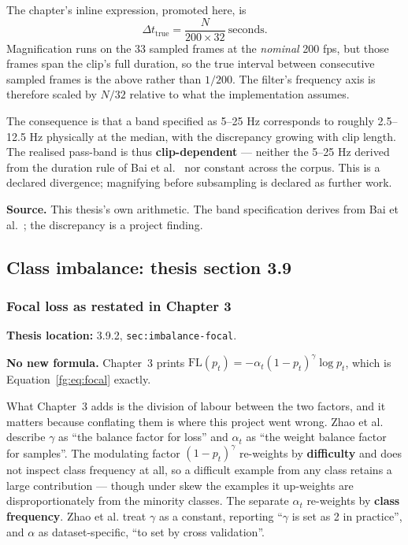 \documentclass[11pt,a4paper]{article}
\numberwithin{equation}{section}
\begin{document}
The chapter's inline expression, promoted here, is
\begin{equation}
    \Delta t_{\mathrm{true}}=\frac{N}{200\times 32}\ \text{seconds}.
    \label{fg:eq:evm-interval}
\end{equation}
Magnification runs on the 33 sampled frames at the \emph{nominal} 200 fps, but
those frames span the clip's full duration, so the true interval between
consecutive sampled frames is the above rather than $1/200$. The filter's
frequency axis is therefore scaled by $N/32$ relative to what the
implementation assumes.

The consequence is that a band specified as 5--25 Hz corresponds to roughly
2.5--12.5 Hz physically at the median, with the discrepancy growing with clip
length. The realised pass-band is thus \textbf{clip-dependent} --- neither the
5--25 Hz derived from the duration rule of Bai et al.~\cite{bai2021} nor
constant across the corpus. This is a declared divergence; magnifying before
subsampling is declared as further work.

\textbf{Source.} This thesis's own arithmetic. The band specification derives
from Bai et al.~\cite{bai2021}; the discrepancy is a project finding.

\subsection{Class imbalance: thesis section 3.9}

\subsubsection{Focal loss as restated in Chapter 3}
\label{fg:focal-ch3}
\textbf{Thesis location:} 3.9.2, \texttt{sec:imbalance-focal}.

\textbf{No new formula.} Chapter~3 prints
$\text{FL}(p_t) = -\alpha_t(1-p_t)^{\gamma}\log p_t$, which is
Equation~\eqref{fg:eq:focal} exactly.

What Chapter~3 adds is the division of labour between the two factors, and it
matters because conflating them is where this project went wrong. Zhao et
al.~\cite{zhaoS2021} describe $\gamma$ as ``the balance factor for loss'' and
$\alpha_t$ as ``the weight balance factor for samples''. The modulating factor
$(1-p_t)^\gamma$ re-weights by \textbf{difficulty} and does not inspect class
frequency at all, so a difficult example from any class retains a large
contribution --- though under skew the examples it up-weights are
disproportionately from the minority classes. The separate $\alpha_t$
re-weights by \textbf{class frequency}. Zhao et al. treat $\gamma$ as a
constant, reporting ``$\gamma$ is set as 2 in practice'', and $\alpha$ as
dataset-specific, ``to set by cross validation''.
\end{document}
